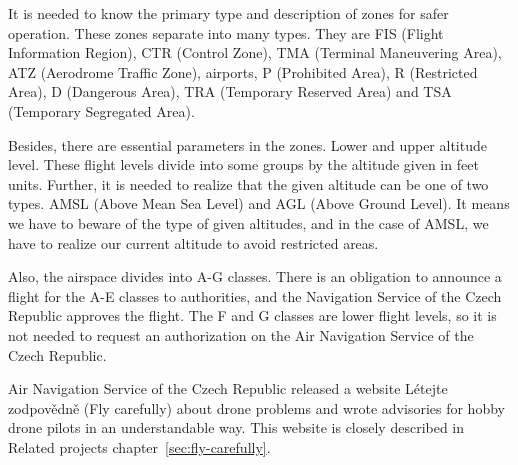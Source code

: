 It is needed to know the primary type and description of zones for safer operation. %
These zones separate into many types. %
They are FIS (Flight Information Region), CTR (Control Zone), TMA (Terminal Maneuvering Area), ATZ (Aerodrome Traffic Zone), airports, P (Prohibited Area), R (Restricted Area), D (Dangerous Area), TRA (Temporary Reserved Area) and TSA (Temporary Segregated Area).\cite{airspace}

Besides, there are essential parameters in the zones.
Lower and upper altitude level.
These flight levels divide into some groups by the altitude given in feet units. %
Further, it is needed to realize that the given altitude can be one of two types. %
AMSL (Above Mean Sea Level) and AGL (Above Ground Level).
It means we have to beware of the type of given altitudes, and in the case of AMSL, we have to realize our current altitude to avoid restricted areas.

Also, the airspace divides into A-G classes.\cite{airspace} %
There is an obligation to announce a flight for the A-E classes to authorities, and the Navigation Service of the Czech Republic approves the flight. %
The F and G classes are lower flight levels, so it is not needed to request an authorization on the Air Navigation Service of the Czech Republic. %

Air Navigation Service of the Czech Republic released a website L{\' e}tejte zodpov{\v e}dn{\v e} (Fly carefully) about drone problems and wrote advisories for hobby drone pilots in an understandable way.
This website is closely described in Related projects chapter~\ref{sec:fly-carefully}.


